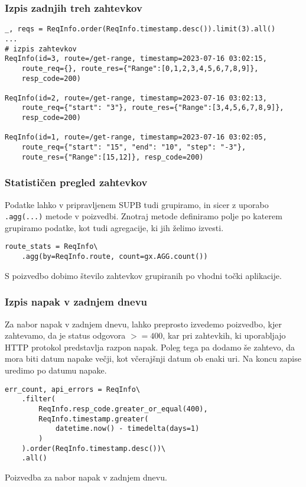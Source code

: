 \documentclass[a4paper,12pt,openright]{book}
\begin{document}
    \subsubsection{Izpis zadnjih treh zahtevkov}

\begin{verbatim}
_, reqs = ReqInfo.order(ReqInfo.timestamp.desc()).limit(3).all()
... 
# izpis zahtevkov
ReqInfo(id=3, route=/get-range, timestamp=2023-07-16 03:02:15, 
    route_req={}, route_res={"Range":[0,1,2,3,4,5,6,7,8,9]},
    resp_code=200)
    
ReqInfo(id=2, route=/get-range, timestamp=2023-07-16 03:02:13, 
    route_req={"start": "3"}, route_res={"Range":[3,4,5,6,7,8,9]},
    resp_code=200)
    
ReqInfo(id=1, route=/get-range, timestamp=2023-07-16 03:02:05,
    route_req={"start": "15", "end": "10", "step": "-3"},
    route_res={"Range":[15,12]}, resp_code=200)
\end{verbatim}

    \newpage
    \subsubsection{Statističen pregled zahtevkov}

    Podatke lahko v pripravljenem SUPB tudi grupiramo, in sicer z uporabo {\tt .agg(...)} metode v poizvedbi. Znotraj metode definiramo polje po katerem grupiramo podatke, kot tudi agregacije, ki jih želimo izvesti.
    
\begin{verbatim}
route_stats = ReqInfo\
    .agg(by=ReqInfo.route, count=gx.AGG.count())
\end{verbatim}

    \noindent
    S poizvedbo dobimo število zahtevkov grupiranih po vhodni točki aplikacije. 

    \subsubsection{Izpis napak v zadnjem dnevu}

    Za nabor napak v zadnjem dnevu, lahko preprosto izvedemo poizvedbo, kjer zahtevamo, da je status odgovora $>= 400$, kar pri zahtevkih, ki uporabljajo HTTP protokol predstavlja razpon napak. Poleg tega pa dodamo še zahtevo, da mora biti datum napake večji, kot včerajšnji datum ob enaki uri. Na koncu zapise uredimo po datumu napake.

\begin{code}
\begin{verbatim}
err_count, api_errors = ReqInfo\
    .filter(
        ReqInfo.resp_code.greater_or_equal(400),
        ReqInfo.timestamp.greater(
            datetime.now() - timedelta(days=1)
        )
    ).order(ReqInfo.timestamp.desc())\
    .all()
\end{verbatim}
\caption{Poizvedba za nabor napak v zadnjem dnevu.}
\label{api_errors_code}
\end{code}
\end{document}
